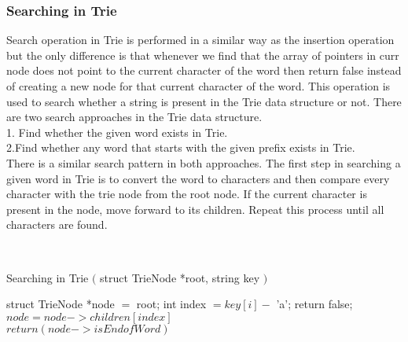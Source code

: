 \documentclass[11pt,a4paper]{article}
\begin{document}
\subsubsection{Searching in Trie}
\label{subsec:SearchingTrie}
Search operation in Trie is performed in a similar way as the insertion operation but the only difference is that whenever we find that the array of pointers in curr node does not point to the current character of the word then return false instead of creating a new node for that current character of the word. This operation is used to search whether a string is present in the Trie data structure or not. There are two search approaches in the Trie data structure.
\\
1. Find whether the given word exists in Trie.
\\
2.Find whether any word that starts with the given prefix exists in Trie.
\\
There is a similar search pattern in both approaches. The first step in searching a given word in Trie is to convert the word to characters and then compare every character with the trie node from the root node. If the current character is present in the node, move forward to its children. Repeat this process until all characters are found.

\\
\begin{algorithm}[H]
\caption*{Searching in Trie \begin{math} ( \end{math} struct TrieNode *root, string key \begin{math} ) \end{math} }
\label{DeletionTriepsuedocode}
\begin{algorithmic}
\STATE struct TrieNode *node \begin{math} = \end{math} root;
\STATE int index \begin{math}= key[i] - \end{math} 'a';
\STATE \hspace{0.5cm} return false;
\ENDIF
\STATE \begin{math} node = node->children[index] \end{math}
\ENDFOR
\\
\begin{math} return (node->isEndofWord) \end{math}
\end{algorithmic}
\end{algorithm}
\end{document}
